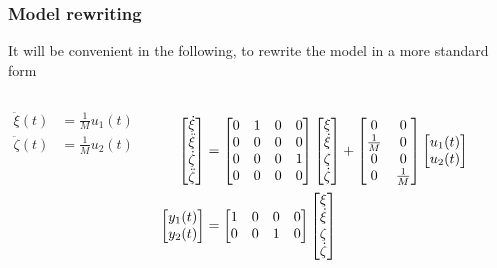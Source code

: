 \begin{frame} 
	\frametitle{Model rewriting}
	It will be convenient in the following, to rewrite the model in a more standard form
    \begin{columns}[onlytextwidth]
        \begin{align*}
        \ddot{\xi}(t)& = \frac{1}{M} u_1(t) \\
        \ddot{\zeta}(t)& = \frac{1}{M} u_2(t)
        \end{align*}
    	\begin{align*}
    	  \begin{bmatrix}\dot{\xi}\\\ddot{\xi}\\\dot{\zeta}\\\ddot{\zeta}\end{bmatrix}&=
          \begin{bmatrix}0&1&0&0\\0&0&0&0\\0&0&0&1\\0&0&0&0\end{bmatrix}\begin{bmatrix}\xi\\\dot{\xi}\\{\zeta}\\\dot{\zeta}\end{bmatrix} + \begin{bmatrix}0&0\\ \frac{1}{M} &0\\0&0 \\0&\frac{1}{M}\end{bmatrix} \begin{bmatrix}u_1(t)\\u_2(t)\end{bmatrix}\\
          \begin{bmatrix}y_1(t)\\y_2(t)\end{bmatrix}&=\begin{bmatrix}1&0&0&0\\0&0&1&0\end{bmatrix}\begin{bmatrix}\xi\\\dot{\xi}\\{\zeta}\\\dot{\zeta}\end{bmatrix}
    	\end{align*}
    \end{columns}
\end{frame}

